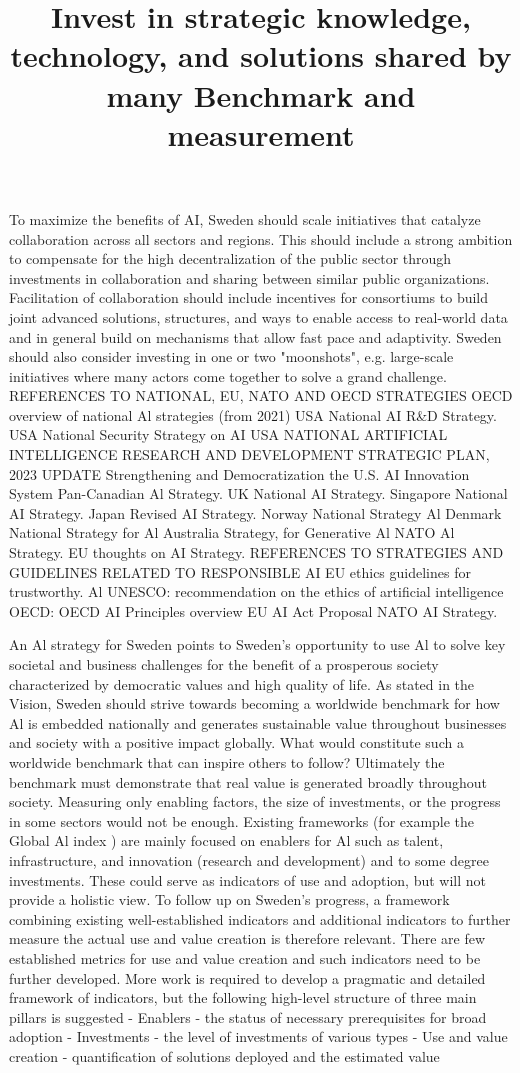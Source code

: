 \title{
Invest in strategic knowledge, technology, and solutions shared by many
}
To maximize the benefits of AI, Sweden should scale initiatives that catalyze collaboration across all sectors and regions. This should include a strong ambition to compensate for the high decentralization of the public sector through investments in collaboration and sharing between similar public organizations.
Facilitation of collaboration should include incentives for consortiums to build joint advanced solutions, structures, and ways to enable access to real-world data and in general build on mechanisms that allow fast pace and adaptivity.
Sweden should also consider investing in one or two "moonshots", e.g. large-scale initiatives where many actors come together to solve a grand challenge.
REFERENCES TO NATIONAL, EU, NATO AND OECD STRATEGIES
OECD overview of national Al strategies (from 2021)
USA National AI R\&D Strategy.
USA National Security Strategy on AI
USA NATIONAL ARTIFICIAL INTELLIGENCE RESEARCH AND DEVELOPMENT STRATEGIC PLAN, 2023 UPDATE Strengthening and Democratization the U.S. AI Innovation System
Pan-Canadian Al Strategy.
UK National AI Strategy.
Singapore National AI Strategy.
Japan Revised AI Strategy.
Norway National Strategy Al
Denmark National Strategy for Al
Australia Strategy, for Generative Al
NATO Al Strategy.
EU thoughts on AI Strategy.
REFERENCES TO STRATEGIES AND GUIDELINES RELATED TO RESPONSIBLE AI
EU ethics guidelines for trustworthy. Al
UNESCO: recommendation on the ethics of artificial intelligence
OECD: OECD AI Principles overview
EU AI Act Proposal
NATO AI Strategy.

\title{
Benchmark and measurement
}
An Al strategy for Sweden points to Sweden's opportunity to use Al to solve key societal and business challenges for the benefit of a prosperous society characterized by democratic values and high quality of life.
As stated in the Vision, Sweden should strive towards becoming a worldwide benchmark for how Al is embedded nationally and generates sustainable value throughout businesses and society with a positive impact globally. What would constitute such a worldwide benchmark that can inspire others to follow?
Ultimately the benchmark must demonstrate that real value is generated broadly throughout society. Measuring only enabling factors, the size of investments, or the progress in some sectors would not be enough.
Existing frameworks (for example the Global Al index ) are mainly focused on enablers for Al such as talent, infrastructure, and innovation (research and development) and to some degree investments. These could serve as indicators of use and adoption, but will not provide a holistic view.
To follow up on Sweden's progress, a framework combining existing well-established indicators and additional indicators to further measure the actual use and value creation is therefore relevant. There are few established metrics for use and value creation and such indicators need to be further developed.
More work is required to develop a pragmatic and detailed framework of indicators, but the following high-level structure of three main pillars is suggested
- Enablers - the status of necessary prerequisites for broad adoption
- Investments - the level of investments of various types
- Use and value creation - quantification of solutions deployed and the estimated value

